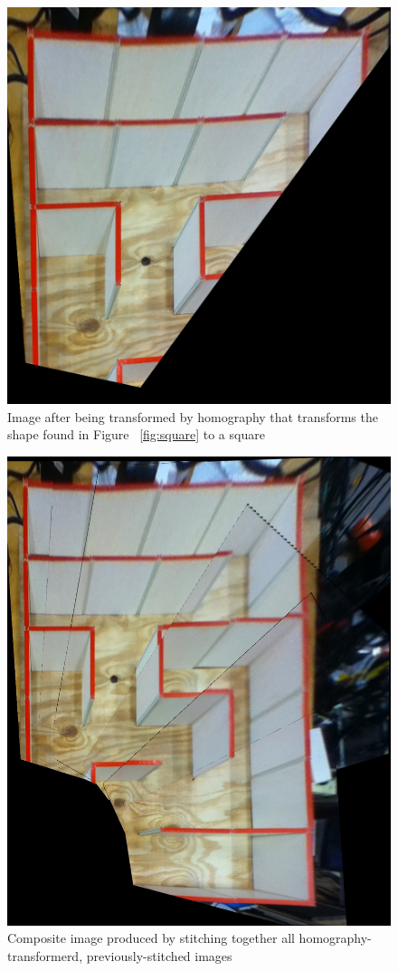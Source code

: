 \documentclass[10pt,twocolumn,letterpaper]{article}
\begin{document}
\begin{figure}[h!]
\begin{center}
		\includegraphics[width=0.8\linewidth]{images/ortho.png}
\end{center}
\caption{Image after being transformed by homography that transforms the shape found in Figure ~\ref{fig:square} to a
square}
\label{fig:ortho}
\end{figure}

\begin{figure}[h!]
\begin{center}
		\includegraphics[width=0.8\linewidth]{images/final.jpg}
\end{center}
\caption{Composite image produced by stitching together all homography-transformerd, previously-stitched images}
\label{fig:final}
\end{figure}
\end{document}

